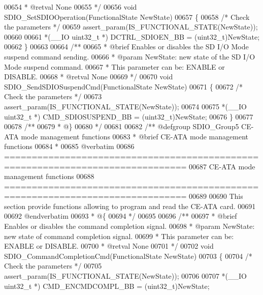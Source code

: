 \begin{DoxyCode}
00654 \textcolor{comment}{  * @retval None}
00655 \textcolor{comment}{  */}
00656 \textcolor{keywordtype}{void} SDIO_SetSDIOOperation(FunctionalState NewState)
00657 \{
00658   \textcolor{comment}{/* Check the parameters */}
00659   assert_param(IS\_FUNCTIONAL\_STATE(NewState));
00660 
00661   *(\_\_IO uint32\_t *) DCTRL_SDIOEN_BB = (uint32\_t)NewState;
00662 \}
00663 
00664 \textcolor{comment}{/**}
00665 \textcolor{comment}{  * @brief  Enables or disables the SD I/O Mode suspend command sending.}
00666 \textcolor{comment}{  * @param  NewState: new state of the SD I/O Mode suspend command.}
00667 \textcolor{comment}{  *         This parameter can be: ENABLE or DISABLE.}
00668 \textcolor{comment}{  * @retval None}
00669 \textcolor{comment}{  */}
00670 \textcolor{keywordtype}{void} SDIO_SendSDIOSuspendCmd(FunctionalState NewState)
00671 \{
00672   \textcolor{comment}{/* Check the parameters */}
00673   assert_param(IS\_FUNCTIONAL\_STATE(NewState));
00674 
00675   *(\_\_IO uint32\_t *) CMD_SDIOSUSPEND_BB = (uint32\_t)NewState;
00676 \}
00677 
00678 \textcolor{comment}{/**}
00679 \textcolor{comment}{  * @\}}
00680 \textcolor{comment}{  */}
00681 
00682 \textcolor{comment}{/** @defgroup SDIO\_Group5 CE-ATA mode management functions}
00683 \textcolor{comment}{ *  @brief   CE-ATA mode management functions}
00684 \textcolor{comment}{ *}
00685 \textcolor{comment}{@verbatim   }
00686 \textcolor{comment}{ ===============================================================================}
00687 \textcolor{comment}{              CE-ATA mode management functions}
00688 \textcolor{comment}{ ===============================================================================  }
00689 \textcolor{comment}{}
00690 \textcolor{comment}{  This section provide functions allowing to program and read the CE-ATA card.}
00691 \textcolor{comment}{}
00692 \textcolor{comment}{@endverbatim}
00693 \textcolor{comment}{  * @\{}
00694 \textcolor{comment}{  */}
00695 
00696 \textcolor{comment}{/**}
00697 \textcolor{comment}{  * @brief  Enables or disables the command completion signal.}
00698 \textcolor{comment}{  * @param  NewState: new state of command completion signal. }
00699 \textcolor{comment}{  *         This parameter can be: ENABLE or DISABLE.}
00700 \textcolor{comment}{  * @retval None}
00701 \textcolor{comment}{  */}
00702 \textcolor{keywordtype}{void} SDIO_CommandCompletionCmd(FunctionalState NewState)
00703 \{
00704   \textcolor{comment}{/* Check the parameters */}
00705   assert_param(IS\_FUNCTIONAL\_STATE(NewState));
00706 
00707   *(\_\_IO uint32\_t *) CMD_ENCMDCOMPL_BB = (uint32\_t)NewState;

\end{DoxyCode}
